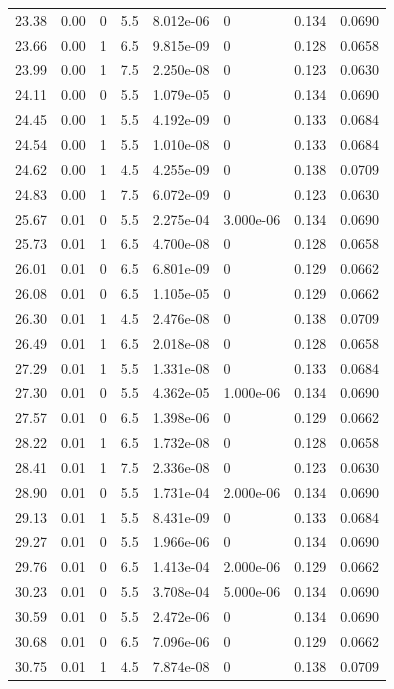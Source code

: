 \documentclass[preview]{standalone}
\begin{document}
{{{\begin{tabular}{L{1.2cm}C{1.2cm} C{0.3cm}C{0.5cm} C{1.4cm}C{1.4cm} C{1.4cm}C{1.4cm}}
  23.38  &  0.00  & 0     & 5.5 &  8.012e-06  & 0  & 0.134 &  0.0690   \\ 
  23.66  &  0.00  & 1     & 6.5 &  9.815e-09  & 0  & 0.128 &  0.0658   \\ 
  23.99  &  0.00  & 1     & 7.5 &  2.250e-08  & 0  & 0.123 &  0.0630   \\ 
  24.11  &  0.00  & 0     & 5.5 &  1.079e-05  & 0  & 0.134 &  0.0690   \\ 
  24.45  &  0.00  & 1     & 5.5 &  4.192e-09  & 0  & 0.133 &  0.0684   \\ 
  24.54  &  0.00  & 1     & 5.5 &  1.010e-08  & 0  & 0.133 &  0.0684   \\ 
  24.62  &  0.00  & 1     & 4.5 &  4.255e-09  & 0  & 0.138 &  0.0709   \\ 
  24.83  &  0.00  & 1     & 7.5 &  6.072e-09  & 0  & 0.123 &  0.0630   \\ 
  25.67  &  0.01  & 0     & 5.5 &  2.275e-04  & 3.000e-06  & 0.134 &  0.0690   \\ 
  25.73  &  0.01  & 1     & 6.5 &  4.700e-08  & 0  & 0.128 &  0.0658   \\ 
  26.01  &  0.01  & 0     & 6.5 &  6.801e-09  & 0  & 0.129 &  0.0662   \\ 
  26.08  &  0.01  & 0     & 6.5 &  1.105e-05  & 0  & 0.129 &  0.0662   \\ 
  26.30  &  0.01  & 1     & 4.5 &  2.476e-08  & 0  & 0.138 &  0.0709   \\ 
  26.49  &  0.01  & 1     & 6.5 &  2.018e-08  & 0  & 0.128 &  0.0658   \\ 
  27.29  &  0.01  & 1     & 5.5 &  1.331e-08  & 0  & 0.133 &  0.0684   \\ 
  27.30  &  0.01  & 0     & 5.5 &  4.362e-05  & 1.000e-06  & 0.134 &  0.0690   \\ 
  27.57  &  0.01  & 0     & 6.5 &  1.398e-06  & 0  & 0.129 &  0.0662   \\ 
  28.22  &  0.01  & 1     & 6.5 &  1.732e-08  & 0  & 0.128 &  0.0658   \\ 
  28.41  &  0.01  & 1     & 7.5 &  2.336e-08  & 0  & 0.123 &  0.0630   \\ 
  28.90  &  0.01  & 0     & 5.5 &  1.731e-04  & 2.000e-06  & 0.134 &  0.0690   \\ 
  29.13  &  0.01  & 1     & 5.5 &  8.431e-09  & 0  & 0.133 &  0.0684   \\ 
  29.27  &  0.01  & 0     & 5.5 &  1.966e-06  & 0  & 0.134 &  0.0690   \\ 
  29.76  &  0.01  & 0     & 6.5 &  1.413e-04  & 2.000e-06  & 0.129 &  0.0662   \\ 
  30.23  &  0.01  & 0     & 5.5 &  3.708e-04  & 5.000e-06  & 0.134 &  0.0690   \\ 
  30.59  &  0.01  & 0     & 5.5 &  2.472e-06  & 0  & 0.134 &  0.0690   \\ 
  30.68  &  0.01  & 0     & 6.5 &  7.096e-06  & 0  & 0.129 &  0.0662   \\ 
  30.75  &  0.01  & 1     & 4.5 &  7.874e-08  & 0  & 0.138 &  0.0709   \\ 
\hline 
\end{tabular} 

}}}
\end{document}
